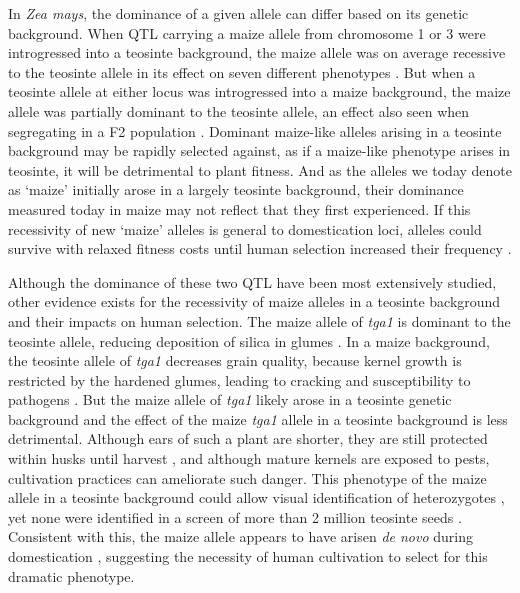 \documentclass[9pt,twocolumn,twoside]{rilabRxiv}
\begin{document}
In \textit{Zea mays}, the dominance of a given allele can differ based on its genetic background.
When QTL carrying a maize allele from chromosome 1 or 3 were introgressed into a teosinte background, the maize allele was on average recessive to the teosinte allele in its effect on seven different phenotypes \citep{doebley1995}.
But when a teosinte allele at either locus was introgressed into a maize background, the maize allele was partially dominant to the teosinte allele, an effect also seen when segregating in a F2 population \citep{doebley1995}.
Dominant maize-like alleles arising in a teosinte background may be rapidly selected against, as if a maize-like phenotype arises in teosinte, it will be detrimental to plant fitness.
And as the alleles we today denote as `maize' initially arose in a largely teosinte background, their dominance measured today in maize  may not reflect that they first experienced.
If this recessivity of new `maize' alleles is general to domestication loci, alleles could survive with relaxed fitness costs until human selection increased their frequency \citep{doebley1995, lauter2002}.

Although the dominance of these two QTL have been most extensively studied, other evidence exists for the recessivity of maize alleles in a teosinte background and their impacts on human selection.
The maize allele of \textit{tga1} is dominant to the teosinte allele, reducing deposition of silica in glumes \citep{dorweiler1997}.
In a maize background, the teosinte allele of \textit{tga1} decreases grain quality, because kernel growth is restricted by the hardened glumes, leading to cracking and susceptibility to pathogens \citep{dorweiler1993}.
But the maize allele of \textit{tga1} likely arose in a teosinte genetic background and the effect of the maize \textit{tga1} allele in a teosinte background is less detrimental.
Although ears of such a plant are shorter, they are still protected within husks until harvest \citep{dorweiler1993},  and although mature kernels are exposed to pests, cultivation practices can ameliorate such danger.
This phenotype of the maize allele in a teosinte background could allow visual identification of heterozygotes \citep{wang2005}, yet none were identified in a screen of more than 2 million teosinte seeds \citep{beadle1980, wilkes2004, bergsingerbook}.
Consistent with this, the maize allele appears to have arisen \textit{de novo} during domestication  \citep{wang2015}, suggesting  the necessity of human cultivation to select for this dramatic phenotype.
\end{document}
